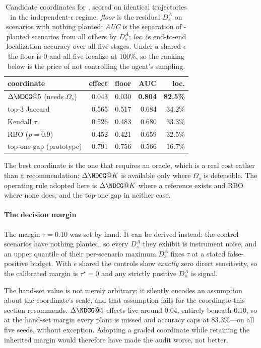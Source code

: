 \begin{table}[t]
  \caption{Candidate coordinates for , scored on identical trajectories in the
    independent-$\epsilon$ regime. \emph{floor} is the residual $D_s^{A}$ on scenarios with
    nothing planted; \emph{AUC} is the separation of -planted scenarios from all
    others by $D_s^{A}$; \emph{loc.} is end-to-end localization accuracy over all five stages.
    Under a shared $\epsilon$ the floor is $0$ and all five localize at $100\%$, so the ranking
    below is the price of not controlling the agent's sampling.}
  \label{tab:rank-coords}
  \begin{tabular}{lrrrr}
    \toprule
    coordinate & effect & floor & AUC & loc. \\
    \midrule
    $\Delta\NDCG@5$ (needs $\Omega_s$) & 0.043 & 0.030 & \textbf{0.804} & \textbf{82.5\%} \\
    top-3 Jaccard                      & 0.565 & 0.517 & 0.684 & 34.2\% \\
    Kendall $\tau$                     & 0.526 & 0.483 & 0.680 & 33.3\% \\
    RBO ($p = 0.9$)                    & 0.452 & 0.421 & 0.659 & 32.5\% \\
    top-one gap (prototype)            & 0.791 & 0.756 & 0.566 & 16.7\% \\
    \bottomrule
  \end{tabular}
\end{table}

The best coordinate is the one that requires an oracle, which is a real cost rather than a
recommendation: $\Delta\NDCG@K$ is available only where $\Omega_s$ is defensible. The operating
rule adopted here is $\Delta\NDCG@K$ where a reference exists and RBO where none does, and the
top-one gap in neither case.

\paragraph{The decision margin}
The margin $\tau = 0.10$ was set by hand. It can be derived instead: the control scenarios have
nothing planted, so every $D_s^{A}$ they exhibit is instrument noise, and an upper quantile of
their per-scenario maximum $D_s^{A}$ fixes $\tau$ at a stated false-positive budget. With
$\epsilon$ shared the controls show \emph{exactly} zero direct sensitivity, so the calibrated
margin is $\tau^\star = 0$ and any strictly positive $D_s^{A}$ is signal.

The hand-set value is not merely arbitrary; it silently encodes an assumption about the
coordinate's scale, and that assumption fails for the coordinate this section recommends.
$\Delta\NDCG@5$ effects live around $0.04$, entirely beneath $0.10$, so at the hand-set margin
every  plant is missed and accuracy caps at $83.3\%$---on all five seeds, without
exception. Adopting a graded coordinate while retaining the inherited margin would therefore have
made the audit worse, not better.

